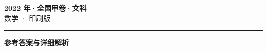 \documentclass[zihao=5, a4paper]{ctexart}
\begin{document}
\begin{center}
  {\Large\bfseries 2022 年·全国甲卷·文科}\\[4pt]
  {\large 数学 · 印刷版}
\end{center}
\medskip
{}

\par\bigskip\hrule\bigskip
{}
\begin{center}{\large\bfseries 参考答案与详细解析}\end{center}
\smallskip

\end{document}
